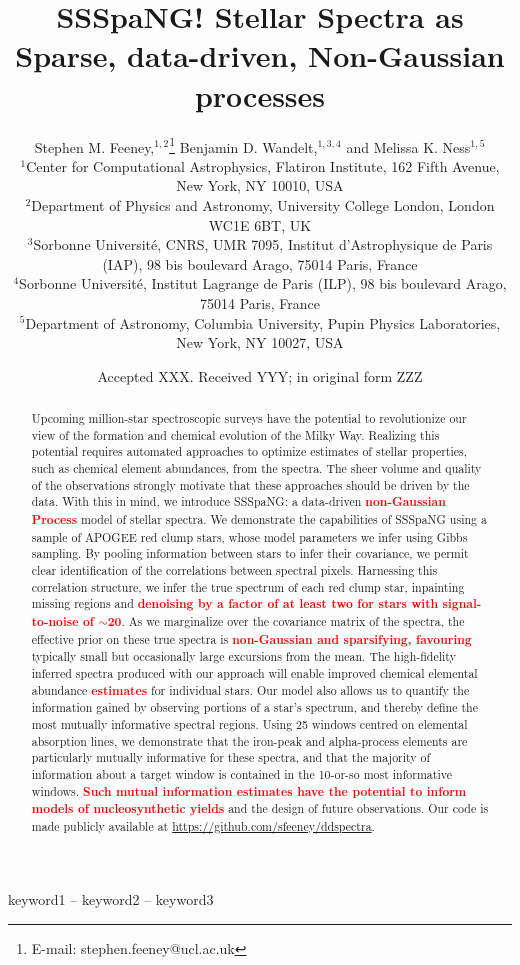 \documentclass[a4paper,fleqn,usenatbib]{mnras}
\title[Stellar Spectra as Sparse Non-Gaussian Processes]{SSSpaNG! Stellar Spectra as Sparse, data-driven, Non-Gaussian processes}
\author[S. M. Feeney et al.]{
Stephen M. Feeney,$^{1,2}$\thanks{E-mail: stephen.feeney@ucl.ac.uk}
Benjamin D. Wandelt,$^{1,3,4}$
and Melissa K. Ness$^{1,5}$ 
\\
$^{1}$Center for Computational Astrophysics, Flatiron Institute, 162 Fifth Avenue, New York, NY 10010, USA\\
$^{2}$Department of Physics and Astronomy, University College London, London WC1E 6BT, UK\\
$^{3}$Sorbonne Universit\'e, CNRS, UMR 7095,  Institut d'Astrophysique de Paris (IAP), 98 bis boulevard Arago, 75014 Paris, France\\
$^{4}$Sorbonne Universit\'e, Institut Lagrange de Paris (ILP), 98 bis boulevard Arago, 75014 Paris, France\\
$^{5}$Department of Astronomy, Columbia University, Pupin Physics Laboratories, New York, NY 10027, USA
}
\date{Accepted XXX. Received YYY; in original form ZZZ}
\newcommand\edit[1]{\textcolor{red}{\textbf{#1}}}
\begin{document}
\label{firstpage}
\pagerange{\pageref{firstpage}--\pageref{lastpage}}
\maketitle

\begin{abstract}
Upcoming million-star spectroscopic surveys have the potential to revolutionize our view of the formation and chemical evolution of the Milky Way. Realizing this potential requires automated approaches to optimize estimates of stellar properties, such as chemical element abundances, from the spectra. The sheer volume and quality of the observations strongly motivate that these approaches should be driven by the data. With this in mind, we introduce SSSpaNG: a data-driven \edit{non-Gaussian Process} model of stellar spectra. We demonstrate the capabilities of SSSpaNG using a sample of APOGEE red clump stars, whose model parameters we infer using Gibbs sampling. By pooling information between stars to infer their covariance, we permit clear identification of the correlations between spectral pixels. Harnessing this correlation structure, we infer the true spectrum of each red clump star, inpainting missing regions and \edit{denoising by a factor of at least two for stars with signal-to-noise of $\sim$20}. As we marginalize over the covariance matrix of the spectra, the effective prior on these true spectra is \edit{non-Gaussian and sparsifying, favouring} typically small but occasionally large excursions from the mean. The high-fidelity inferred spectra produced with our approach will enable improved chemical elemental abundance \edit{estimates} for individual stars. Our model also allows us to quantify the information gained by observing portions of a star's spectrum, and thereby define the most mutually informative spectral regions. Using 25 windows centred on elemental absorption lines, we demonstrate that the iron-peak and alpha-process elements are particularly mutually informative for these spectra, and that the majority of information about a target window is contained in the 10-or-so most informative windows. \edit{Such mutual information estimates have the potential to inform models of nucleosynthetic yields} and the design of future observations. Our code is made publicly available at \href{https://github.com/sfeeney/ddspectra}{https://github.com/sfeeney/ddspectra}. 
\end{abstract}

\begin{keywords}
keyword1 -- keyword2 -- keyword3
\end{keywords}
\end{document}

